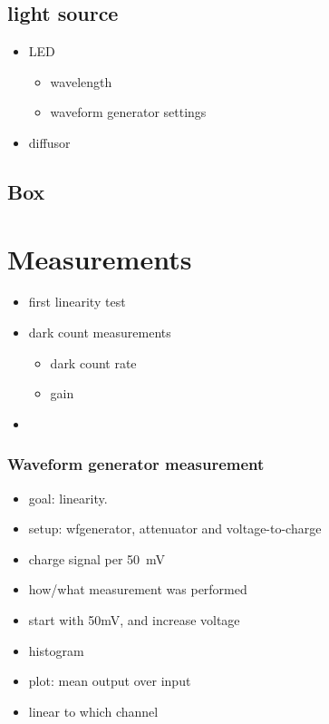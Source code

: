 \section{light source}
\begin{itemize}
    \item LED
    \begin{itemize}
        \item wavelength
        \item waveform generator settings
    \end{itemize}
    \item diffusor 
\end{itemize}

\section{Box}


\chapter{Measurements}
\begin{itemize}
    \item first linearity test
    \item dark count measurements
    \begin{itemize}
        \item dark count rate
        \item gain
    \end{itemize}
    \item 
\end{itemize}
\subsection{Waveform generator measurement}
\begin{itemize}
    \item goal: linearity.
    \item setup: wfgenerator, attenuator and voltage-to-charge
    \item charge signal per \SI{50}{\milli\volt}
    \item how/what measurement was performed
    \item start with 50mV, and increase voltage
    \item histogram
    \item plot: mean output over input
    \item linear to which channel
\end{itemize}

